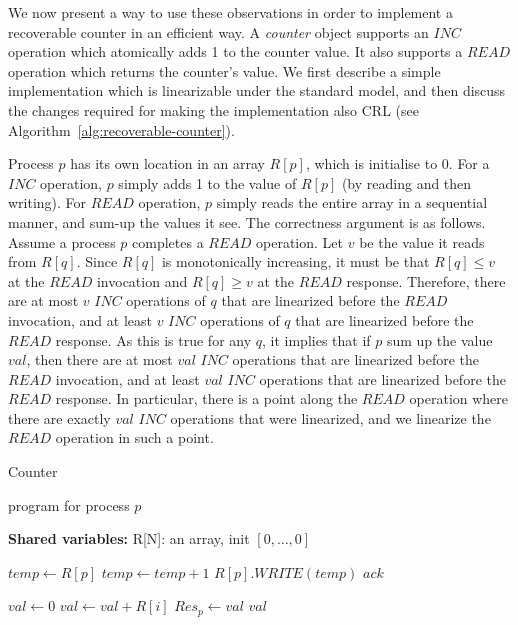 We now present a way to use these observations in order to implement a recoverable counter in an efficient way. A \textit{counter} object supports an $INC$ operation which atomically adds 1 to the counter value. It also supports a $READ$ operation which returns the counter's value. We first describe a simple implementation which is linearizable under the standard model, and then discuss the changes required for making the implementation also CRL (see Algorithm~\ref{alg:recoverable-counter}).


Process $p$ has its own location in an array $R[p]$, which is initialise to 0. For a $INC$ operation, $p$ simply adds 1 to the value of $R[p]$ (by reading and then writing). For $READ$ operation, $p$ simply reads the entire array in a sequential manner, and sum-up the values it see.
The correctness argument is as follows. Assume a process $p$ completes a $READ$ operation. Let $v$ be the value it reads from $R[q]$. Since $R[q]$ is monotonically increasing, it must be that $R[q] \leq v$ at the $READ$ invocation and $R[q] \geq v$ at the $READ$ response. Therefore, there are at most $v$ $INC$ operations of $q$ that are linearized before the $READ$ invocation, and at least $v$ $INC$ operations of $q$ that are linearized before the $READ$ response. As this is true for any $q$, it implies that if $p$ sum up the value $val$, then there are at most $val$ $INC$ operations that are linearized before the $READ$ invocation, and at least $val$ $INC$ operations that are linearized before the $READ$ response. In particular, there is a point along the $READ$ operation where there are exactly $val$ $INC$ operations that were linearized, and we linearize the $READ$ operation in such a point.

\begin{varalgorithm}{Counter}

	\caption{program for process $p$}
	\label{alg:recoverable-counter}
	
	\hspace*{\algorithmicindent} \textbf{Shared variables:}
	R[N]: an array, init $[0,\ldots,0]$

	\begin{multicols}{2}
	\begin{algorithmic}[1]	
		\State $temp \gets R[p]$
		\State $temp \gets temp+1$
		\State $R[p].WRITE(temp)$
		\State \Return $ack$
		\EndProcedure
		
		\columnbreak
		
		\State $val \gets 0$
			\State $val \gets val+R[i]$
		\EndFor
		\State $Res_p \gets val$
		\State \Return $val$
		\EndProcedure
	\end{algorithmic}
\end{multicols}
\end{varalgorithm}

